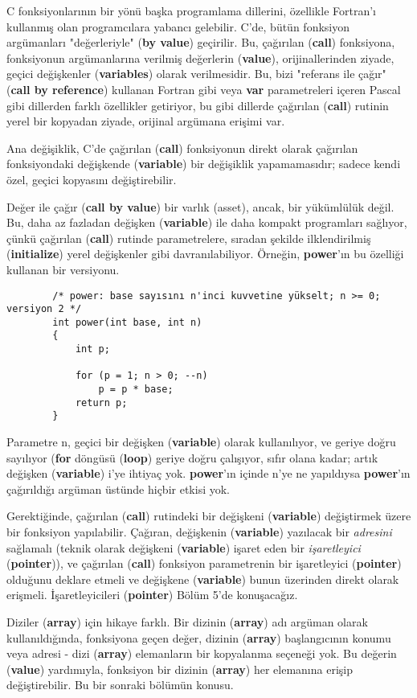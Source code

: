 \documentclass[a4paper,12pt,oneside]{book}
\begin{document}
C fonksiyonlarının bir yönü başka programlama dillerini, özellikle Fortran'ı kullanmış olan programcılara yabancı gelebilir. C'de, bütün fonksiyon argümanları "değerleriyle" (\textbf{by value}) geçirilir. Bu, çağırılan (\textbf{call}) fonksiyona, fonksiyonun argümanlarına verilmiş değerlerin (\textbf{value}), orijinallerinden ziyade, geçici değişkenler (\textbf{variables}) olarak verilmesidir. Bu, bizi "referans ile çağır" (\textbf{call by reference}) kullanan Fortran gibi veya \textbf{var} parametreleri içeren Pascal gibi dillerden farklı özellikler getiriyor, bu gibi dillerde çağırılan (\textbf{call}) rutinin yerel bir kopyadan ziyade, orijinal argümana erişimi var.
\par Ana değişiklik, C'de çağırılan (\textbf{call}) fonksiyonun direkt olarak çağırılan fonksiyondaki değişkende (\textbf{variable}) bir değişiklik yapamamasıdır; sadece kendi özel, geçici kopyasını değiştirebilir.
\par Değer ile çağır (\textbf{call by value}) bir varlık (asset), ancak, bir yükümlülük değil. Bu, daha az fazladan değişken (\textbf{variable}) ile daha kompakt programları sağlıyor, çünkü çağırılan (\textbf{call}) rutinde parametrelere, sıradan şekilde ilklendirilmiş (\textbf{initialize}) yerel değişkenler gibi davranılabiliyor. Örneğin, \textbf{power}'ın bu özelliği kullanan bir versiyonu. \pagebreak
\begin{lstlisting}
		/* power: base sayısını n'inci kuvvetine yükselt; n >= 0; versiyon 2 */
		int power(int base, int n)
		{
			int p;

			for (p = 1; n > 0; --n)
				p = p * base;
			return p;
		}
\end{lstlisting}
Parametre n, geçici bir değişken (\textbf{variable}) olarak kullanılıyor, ve geriye doğru sayılıyor (\textbf{for} döngüsü (\textbf{loop}) geriye doğru çalışıyor, sıfır olana kadar; artık değişken (\textbf{variable}) i'ye ihtiyaç yok. \textbf{power}'ın içinde n'ye ne yapıldıysa \textbf{power}'ın çağırıldığı argüman üstünde hiçbir etkisi yok.
\par Gerektiğinde, çağırılan (\textbf{call}) rutindeki bir değişkeni (\textbf{variable}) değiştirmek üzere bir fonksiyon yapılabilir. Çağıran, değişkenin (\textbf{variable}) yazılacak bir \textit{adresini} sağlamalı (teknik olarak değişkeni (\textbf{variable}) işaret eden bir \textit{işaretleyici} (\textbf{pointer})), ve çağırılan (\textbf{call}) fonksiyon parametrenin bir işaretleyici (\textbf{pointer}) olduğunu deklare etmeli ve değişkene (\textbf{variable}) bunun üzerinden direkt olarak erişmeli. İşaretleyicileri (\textbf{pointer}) Bölüm 5'de konuşacağız.
\par Diziler (\textbf{array}) için hikaye farklı. Bir dizinin (\textbf{array}) adı argüman olarak kullanıldığında, fonksiyona geçen değer, dizinin (\textbf{array}) başlangıcının konumu veya adresi - dizi (\textbf{array}) elemanların bir kopyalanma seçeneği yok. Bu değerin (\textbf{value}) yardımıyla, fonksiyon bir dizinin (\textbf{array}) her elemanına erişip değiştirebilir. Bu bir sonraki bölümün konusu.
\end{document}
